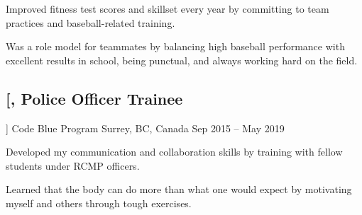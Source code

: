 \documentclass{article}
\newcommand{\datedsubsection}[4][]{
    \subsection*{
        \textbf{\large #2}, #3 \hfill #4
    } %
    \vspace{-4pt} %
    #1 %
}
\begin{document}
{    \begin{compactitem}
    \item Improved fitness test scores and skillset every year by committing to team practices and baseball-related training.
    \item Was a role model for teammates by balancing high baseball performance with excellent results in school, being punctual, and always working hard on the field.
    \end{compactitem}
    
    
    
    \datedsubsection
        [\textit{Police Officer Trainee}]
        {Code Blue Program}
        {Surrey, BC, Canada}
        {Sep 2015 -- May 2019}
    
    \begin{compactitem}
    \item Developed my communication and collaboration skills by training with fellow students under RCMP officers.
    \item Learned that the body can do more than what one would expect by motivating myself and others through tough exercises.
    \end{compactitem}
    
    
    
 }
 
\end{document}

